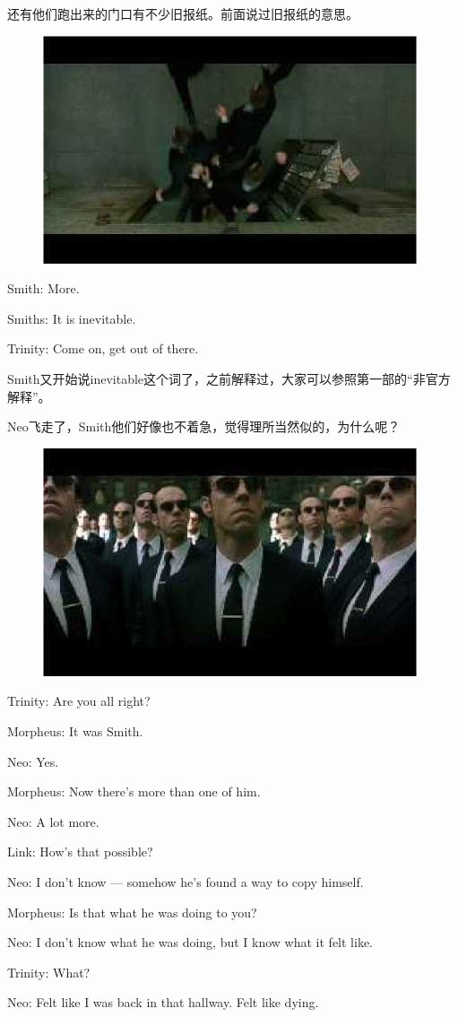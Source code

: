\documentclass{ctexart}
\newenvironment{myquote}{\color{green} \setlength{\leftskip}{6em} \setlength{\rightskip}{4em} \setlength{\parindent}{-2em}}{\par}
\begin{document}
还有他们跑出来的门口有不少旧报纸。前面说过旧报纸的意思。

\begin{figure}[htb]
\centering
\includegraphics[width=0.5\linewidth]{fig/read_reloaded-79}
\end{figure}

\begin{myquote}
Smith: More.

Smiths: It is inevitable.

Trinity: Come on, get out of there.
\end{myquote}

Smith又开始说inevitable这个词了，之前解释过，大家可以参照第一部的“非官方解释”。

Neo飞走了，Smith他们好像也不着急，觉得理所当然似的，为什么呢？

\begin{figure}[htb]
\centering
\includegraphics[width=0.5\linewidth]{fig/read_reloaded-82}
\end{figure}

\begin{myquote}
Trinity: Are you all right?

Morpheus: It was Smith.

Neo: Yes.

Morpheus: Now there's more than one of him.

Neo: A lot more.

Link: How's that possible?

Neo: I don't know --- somehow he's found a way to copy himself.

Morpheus: Is that what he was doing to you?

Neo: I don't know what he was doing, but I know what it felt like.

Trinity: What?

Neo: Felt like I was back in that hallway. Felt like dying.
\end{myquote}
\end{document}
